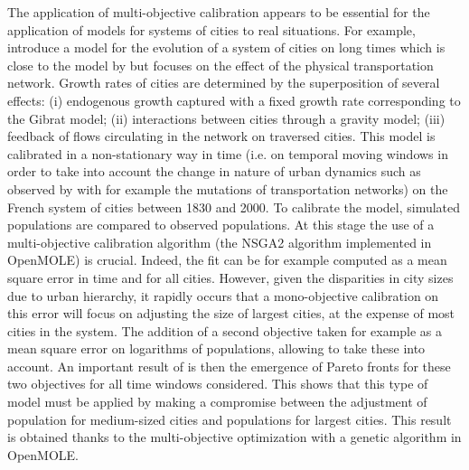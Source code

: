 \documentclass[10pt]{article}
\begin{document}
The application of multi-objective calibration appears to be essential for the application of models for systems of cities to real situations. For example, \cite{raimbault2018indirect} introduce a model for the evolution of a system of cities on long times which is close to the model by \citep{favaro2011gibrat} but focuses on the effect of the physical transportation network. Growth rates of cities are determined by the superposition of several effects: (i) endogenous growth captured with a fixed growth rate corresponding to the Gibrat model; (ii) interactions between cities through a gravity model; (iii) feedback of flows circulating in the network on traversed cities. This model is calibrated in a non-stationary way in time (i.e. on temporal moving windows in order to take into account the change in nature of urban dynamics such as observed by \cite{} with for example the mutations of transportation networks) on the French system of cities between 1830 and 2000. To calibrate the model, simulated populations are compared to observed populations. At this stage the use of a multi-objective calibration algorithm (the NSGA2 algorithm implemented in OpenMOLE) is crucial. Indeed, the fit can be for example computed as a mean square error in time and for all cities. However, given the disparities in city sizes due to urban hierarchy, it rapidly occurs that a mono-objective calibration on this error will focus on adjusting the size of largest cities, at the expense of most cities in the system. The addition of a second objective taken for example as a mean square error on logarithms of populations, allowing to take these into account. An important result of \citep{raimbault2018indirect} is then the emergence of Pareto fronts for these two objectives for all time windows considered. This shows that this type of model must be applied by making a compromise between the adjustment of population for medium-sized cities and populations for largest cities. This result is obtained thanks to the multi-objective optimization with a genetic algorithm in OpenMOLE.
\end{document}
